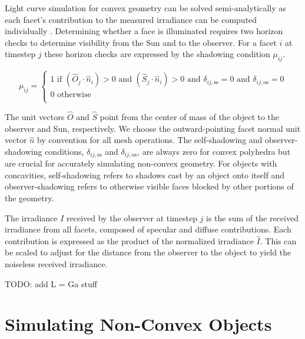 Light curve simulation for convex geometry can be solved semi-analytically as each facet's contribution 
to the measured irradiance can be computed individually \cite{kaasalainen2001}. 
Determining whether a face is illuminated requires two horizon checks to determine visibility 
from the Sun and to the observer. For a facet $i$ at timestep $j$ these horizon checks are 
expressed by the shadowing condition $\mu_{ij}$. 

\begin{equation} \label{eq:cvx_shadow_cond}
  \mu_{ij} = \begin{cases}
    1 \text{ if } \left( \hat{O}_j \cdot \hat{n}_i \right) > 0 \text{ and } \left( \hat{S}_j \cdot \hat{n}_i \right) > 0 
	  \text{ and } \delta_{ij,\text{ss}} = 0 \text{ and } \delta_{ij,\text{os}} = 0\\
    0 \text{ otherwise } \\
  \end{cases}
\end{equation}

The unit vectors $\hat{O}$ and $\hat{S}$ point from the  center of mass of the object to the observer and Sun, respectively. 
We choose the outward-pointing facet normal unit vector $\hat{n}$ by convention for all mesh operations. 
The self-shadowing and observer-shadowing conditions, $\delta_{ij,\text{ss}}$ and $\delta_{ij,\text{os}}$, 
are always zero for convex polyhedra but are crucial for accurately simulating non-convex geometry. 
For objects with concavities, self-shadowing refers to shadows cast by an object onto itself and observer-shadowing 
refers to otherwise visible faces blocked by other portions of the geometry.

The irradiance $I$ received by the observer at timestep $j$ is the sum of the received irradiance from all facets, 
composed of specular and diffuse contributions. Each contribution is expressed as the product of the
normalized irradiance $\hat{I}$. This can be scaled to adjust for the distance from the observer to
the object to yield the noiseless received irradiance.

TODO: add L = Ga stuff

\section{Simulating Non-Convex Objects}

